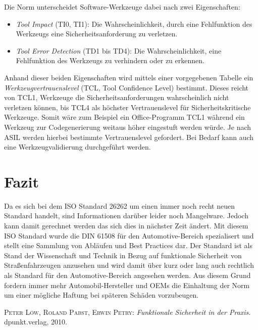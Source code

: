 \documentclass[a4paper,DIV=calc,ngerman]{scrartcl}
\begin{document}
Die Norm unterscheidet Software-Werkzeuge dabei nach zwei Eigenschaften:
\begin{itemize}
    \item \emph{Tool Impact} (TI0, TI1): Die Wahrscheinlichkeit, durch eine Fehlfunktion des Werkzeugs eine Sicherheitsanforderung zu verletzen.
    \item \emph{Tool Error Detection} (TD1 bis TD4): Die Wahrscheinlichkeit, eine Fehlfunktion des Werkzeugs zu verhindern oder zu erkennen.
\end{itemize}
Anhand dieser beiden Eigenschaften wird mittels einer vorgegebenen Tabelle ein \emph{Werkzeugvertrauenslevel} (TCL, Tool Confidence Level) bestimmt. Dieses reicht von TCL1, Werkzeuge die Sicherheitsanforderungen wahrscheinlich nicht verletzen können, bis TCL4 als höchster Vertrauenslevel für Sicherheitskritische Werkzeuge. Somit wäre zum Beispiel ein Office-Programm TCL1 während ein Werkzeug zur Codegenerierung weitaus höher eingestuft werden würde. Je nach ASIL werden hierbei bestimmte Vertrauenslevel gefordert. Bei Bedarf kann auch eine Werkzeugvalidierung durchgeführt werden.





\section{Fazit}
\label{sec:Fazit}
Da es sich bei dem ISO Standard 26262 um einen immer noch recht neuen Standard handelt, sind Informationen darüber leider noch Mangelware. Jedoch kann damit gerechnet werden das sich dies in nächster Zeit ändert. Mit diesem ISO Standard wurde die DIN 61508 für den Automotive-Bereich spezialisert und stellt eine Sammlung von Abläufen und Best Practices dar. Der Standard ist als Stand der Wissenschaft und Technik in Bezug auf funktionale Sicherheit von Straßenfahrzeugen anzusehen und wird damit über kurz oder lang auch rechtlich als Standard für den Automotive-Bereich angesehen werden. Aus diesem Grund fordern immer mehr Automobil-Hersteller und OEMs die Einhaltung der Norm um einer mögliche Haftung bei späteren Schäden vorzubeugen.





\begin{thebibliography}{------}
\label{sec:Literatur}

 \textsc{Peter Löw, Roland Pabst, Erwin Petry}: {\em Funktionale Sicherheit in der Praxis.} dpunkt.verlag, 2010.

\end{thebibliography}
\end{document}
